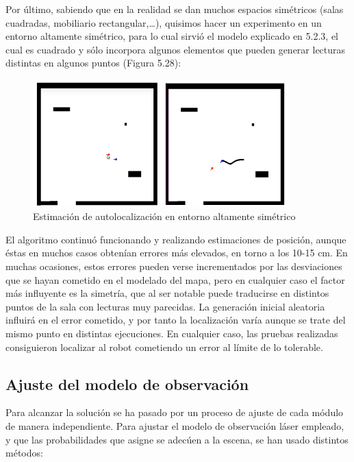 Por último, sabiendo que en la realidad se dan muchos espacios simétricos (salas cuadradas, mobiliario rectangular,…), quisimos hacer un experimento en un entorno altamente simétrico, para lo cual sirvió el modelo explicado en 5.2.3, el cual es cuadrado y sólo incorpora algunos elementos que pueden generar lecturas distintas en algunos puntos (Figura 5.28):

\begin{figure}[H]
	\begin{center}
		\includegraphics[width=0.88\textwidth]{figures/outputsimetrico.png}
		\caption{Estimación de autolocalización en entorno altamente simétrico}
		\label{fig.outputsimetrico}
		\end{center}
\end{figure}

El algoritmo continuó funcionando y realizando estimaciones de posición, aunque éstas en muchos casos obtenían errores más elevados, en torno a los 10-15 cm. En muchas ocasiones, estos errores pueden verse incrementados por las desviaciones que se hayan cometido en el modelado del mapa, pero en cualquier caso el factor más influyente es la simetría, que al ser notable puede traducirse en distintos puntos de la sala con lecturas muy parecidas. La generación inicial aleatoria influirá en el error cometido, y por tanto la localización varía aunque se trate del mismo punto en distintas ejecuciones. En cualquier caso, las pruebas realizadas consiguieron localizar al robot cometiendo un error al límite de lo tolerable.

\subsection{Ajuste del modelo de observación}
Para alcanzar la solución se ha pasado por un proceso de ajuste de cada módulo de manera independiente. Para ajustar el modelo de observación láser empleado, y que las probabilidades que asigne se adecúen a la escena, se han usado distintos métodos:
\vspace{4cm}

